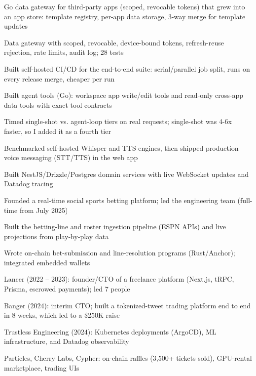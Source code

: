 \documentclass[print]{jack-resume}
\begin{document}
\begin{tightemize}
    \item Go data gateway for third-party apps (scoped, revocable tokens) that grew into an app store: template registry, per-app data storage, 3-way merge for template updates
    \item Data gateway with scoped, revocable, device-bound tokens, refresh-reuse rejection, rate limits, audit log; 28 tests
    \item Built self-hosted CI/CD for the end-to-end suite: serial/parallel job split, runs on every release merge, cheaper per run
    \item Built agent tools (Go): workspace app write/edit tools and read-only cross-app data tools with exact tool contracts
    \item Timed single-shot vs. agent-loop tiers on real requests; single-shot was 4-6x faster, so I added it as a fourth tier
    \item Benchmarked self-hosted Whisper and TTS engines, then shipped production voice messaging (STT/TTS) in the web app
\end{tightemize}
\sectionsep

\begin{tightemize}
    \item Built NestJS/Drizzle/Postgres domain services with live WebSocket updates and Datadog tracing
    \item Founded a real-time social sports betting platform; led the engineering team (full-time from July 2025)
    \item Built the betting-line and roster ingestion pipeline (ESPN APIs) and live projections from play-by-play data
    \item Wrote on-chain bet-submission and line-resolution programs (Rust/Anchor); integrated embedded wallets
\end{tightemize}
\sectionsep

\begin{tightemize}
    \item Lancer (2022 – 2023): founder/CTO of a freelance platform (Next.js, tRPC, Prisma, escrowed payments); led 7 people
    \item Banger (2024): interim CTO; built a tokenized-tweet trading platform end to end in 8 weeks, which led to a \$250K raise
    \item Trustless Engineering (2024): Kubernetes deployments (ArgoCD), ML infrastructure, and Datadog observability
    \item Particles, Cherry Labs, Cypher: on-chain raffles (3,500+ tickets sold), GPU-rental marketplace, trading UIs
\end{tightemize}
\sectionsep
\end{document}
